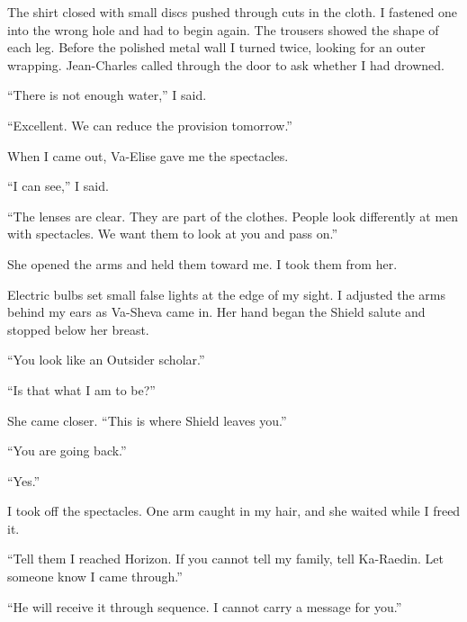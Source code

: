 The shirt closed with small discs pushed through cuts in the cloth. I fastened one into the wrong hole and had to begin again. The trousers showed the shape of each leg. Before the polished metal wall I turned twice, looking for an outer wrapping. Jean-Charles called through the door to ask whether I had drowned.\par

``There is not enough water,'' I said.\par

``Excellent. We can reduce the provision tomorrow.''\par

When I came out, Va-Elise gave me the spectacles.\par

``I can see,'' I said.\par

``The lenses are clear. They are part of the clothes. People look differently at men with spectacles. We want them to look at you and pass on.''\par

She opened the arms and held them toward me. I took them from her.\par

Electric bulbs set small false lights at the edge of my sight. I adjusted the arms behind my ears as Va-Sheva came in. Her hand began the Shield salute and stopped below her breast.\par

``You look like an Outsider scholar.''\par

``Is that what I am to be?''\par

She came closer. ``This is where Shield leaves you.''\par

``You are going back.''\par

``Yes.''\par

I took off the spectacles. One arm caught in my hair, and she waited while I freed it.\par

``Tell them I reached Horizon. If you cannot tell my family, tell Ka-Raedin. Let someone know I came through.''\par

``He will receive it through sequence. I cannot carry a message for you.''\par

